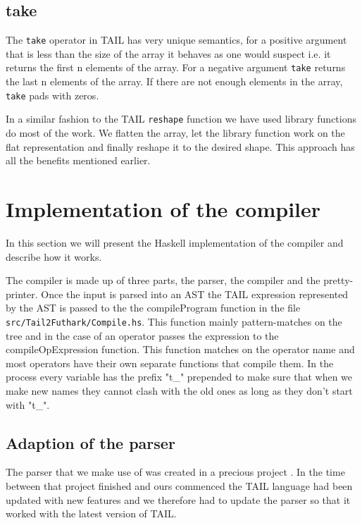 \documentclass[11pt]{article}
\begin{document}
\subsection{take} 

The {\tt take} operator in TAIL has very unique semantics, for a positive argument that is less than the size of the array it behaves as one would suspect i.e. it returns the first n elements of the array.
For a negative argument {\tt take} returns the last n elements of the array.
If there are not enough elements in the array, {\tt take} pads with zeros.

In a similar fashion to the TAIL {\tt reshape} function we have used library functions do most of the work.
We flatten the array, let the library function work on the flat representation and finally reshape it to the desired shape.
This approach has all the benefits mentioned earlier.

\section{Implementation of the compiler}

In this section we will present the Haskell implementation of the compiler and describe how it works.

The compiler is made up of three parts, the parser, the compiler and the pretty-printer. Once the input is parsed into an AST the
TAIL expression represented by the AST is passed to the the compileProgram function in the file \\
{\tt src/Tail2Futhark/Compile.hs}.
This function mainly pattern-matches on the tree and in the case of an operator passes the expression to the compileOpExpression
function.
This function matches on the operator name and most operators have their own separate functions that compile them.
In the process every variable has the prefix "t\_" prepended to make sure that when we make new names they cannot clash
with the old ones as long as they don't start with "t\_".

\subsection{Adaption of the parser}

The parser that we make use of was created in a precious project \cite{APLACC}.
In the time between that project finished and ours commenced the TAIL language
had been updated with new features and we therefore had to update the parser so that it worked with the latest version of TAIL.\\
\end{document}
